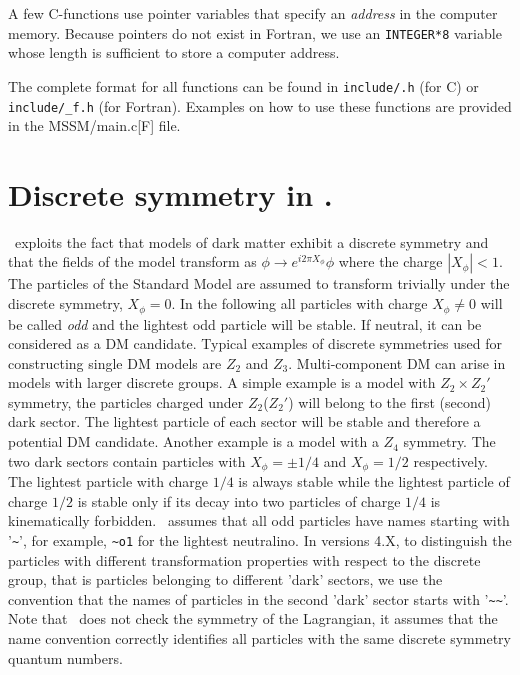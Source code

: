\documentclass[12pt,a4paper]{article}
\begin{document}
A few C-functions use pointer variables that specify an {\it address} in 
the computer memory. Because pointers do not exist in  Fortran,
  we use  an {\tt INTEGER*8} variable  whose length is sufficient to store a computer address.

The complete format  for all functions can be found in
\verb|include/.h| (for C) or
\verb|include/_f.h| (for Fortran). Examples on how to use these functions are provided   
in the MSSM/main.c[F] file. 
 
\section{Discrete symmetry in \micro.}

 \micro\ exploits the fact that models of dark matter exhibit a discrete symmetry
and that the fields  of the model transform as 
$   \phi \to e^{i2\pi X_{\phi}} \phi$
where the charge $|X_{\phi}|<1$. 
The particles of the  Standard Model 
are assumed to transform trivially under the discrete symmetry, $X_\phi=0$. In the following all particles with
 charge $X_\phi\neq 0$  will be called 
 {\it odd} and the  lightest odd particle  will be  stable. If neutral, it can be considered as a DM candidate.
Typical  examples  of discrete symmetries used for constructing single DM models  are $Z_2$ and  $Z_3$. 
Multi-component DM can arise in models with larger discrete groups. A simple 
example is a model with  $Z_2\times Z_2'$ symmetry, the particles charged under  $Z_2$($Z_2'$) will belong to the first (second) dark sector. The lightest particle of each sector  will be stable and therefore a potential DM candidate. 
Another example is a model with a $Z_4$  symmetry.  The two dark sectors contain particles with $X_\phi=\pm 1/4$ and $X_\phi=1/2$ respectively. The lightest particle with  charge $1/4$ is always stable while the lightest particle of charge $1/2$ is stable only if its decay into two particles of charge $1/4$ is kinematically forbidden.
 \micro\ assumes that all odd particles have  names
starting with '\verb|~|', for example, \verb|~o1| for the lightest  
neutralino. In versions 4.X, to distinguish the particles with different transformation properties with 
respect to the discrete group, that is particles belonging to different 'dark' sectors,
we use the convention that the names of particles in the second 'dark' sector starts with '\verb|~~|'. 
Note that \micro\ does not check the symmetry of the Lagrangian, it assumes that the name convention 
correctly identifies  all particles with the same discrete symmetry quantum numbers.
\end{document}
